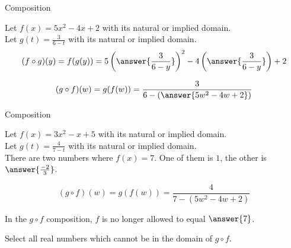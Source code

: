 \documentclass{ximera}
\begin{document}
\begin{example} Composition 



Let $f(x) = 5x^2 - 4x + 2$ with its natural or implied domain. \\
Let $g(t) = \frac{3}{6-t}$ with its natural or implied domain. \\



\[
(f \circ g)(y) = f(g(y)) = 5 \left( \answer{\frac{3}{6-y}} \right)^2 - 4 \left( \answer{\frac{3}{6-y}} \right) + 2
\]





\[
(g \circ f)(w) = g(f(w)) = \frac{3}{6 - \left( \answer{5w^2 - 4w + 2} \right)}
\]



\end{example}










\begin{example} Composition 



Let $f(x) = 3x^2 - x + 5$ with its natural or implied domain. \\
Let $g(t) = \frac{4}{7-t}$ with its natural or implied domain. \\





There are two numbers where $f(x) = 7$.  One of them is $1$, the other is $\answer{\frac{-2}{3}}$.






\[
(g \circ f)(w) = g(f(w)) = \frac{4}{7 - (5w^2 - 4w + 2)}
\]



In the $g \circ f$ composition, $f$ is no longer allowed to equal $\answer{7}$.

Select all real numbers which cannot be in the domain of $g \circ f$.

\begin{selectAll}
\end{selectAll}


\end{example}
\end{document}

